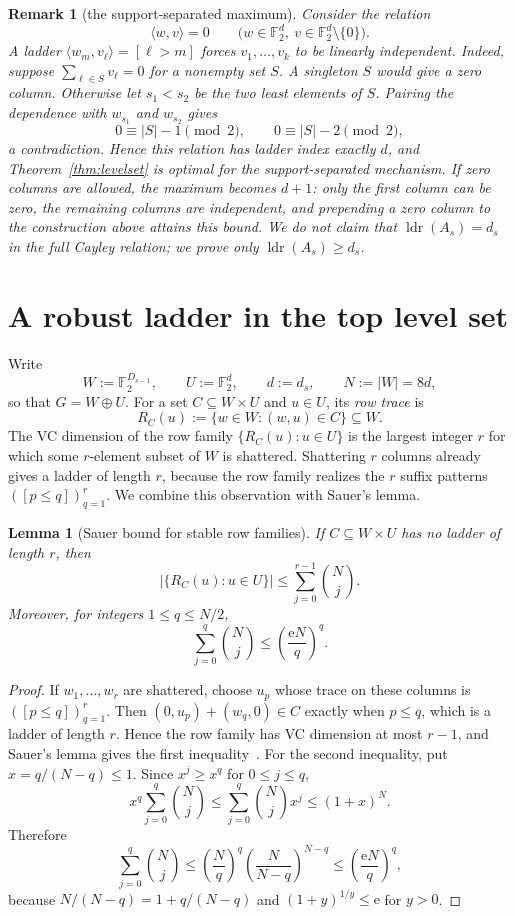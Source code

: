 \documentclass[10pt,a4paper]{amsart}
\newtheorem{lemma}[theorem]{Lemma}
\newtheorem{remark}[theorem]{Remark}
\numberwithin{theorem}{section}
\newcommand{\F}{\mathbb{F}}
\newcommand{\inner}[2]{\langle #1,#2\rangle}
\newcommand{\abs}[1]{\lvert #1\rvert}
\newcommand{\ldr}{\operatorname{ldr}}
\newcommand{\econst}{\mathrm e}
\begin{document}
\begin{remark}[the support-separated maximum]\label{rem:exact}
Consider the relation
\[
  \inner{w}{v}=0
  \qquad\bigl(w\in\F_2^d,\ v\in\F_2^d\setminus\{0\}\bigr).
\]
A ladder $\inner{w_m}{v_\ell}=[\ell>m]$ forces
$v_1,\dots,v_k$ to be linearly independent.  Indeed, suppose
$\sum_{\ell\in S}v_\ell=0$ for a nonempty set $S$.  A singleton $S$ would
give a zero column.  Otherwise let $s_1<s_2$ be the two least elements of
$S$.  Pairing the dependence with $w_{s_1}$ and $w_{s_2}$ gives
\[
  0\equiv\abs S-1\pmod2,
  \qquad
  0\equiv\abs S-2\pmod2,
\]
a contradiction.  Hence this relation has ladder index exactly $d$, and
Theorem~\ref{thm:levelset} is optimal for the support-separated mechanism.
If zero columns are allowed, the maximum becomes $d+1$: only the first
column can be zero, the remaining columns are independent, and prepending a
zero column to the construction above attains this bound.  We do not
claim that $\ldr(A_s)=d_s$ in the full Cayley relation; we prove only
$\ldr(A_s)\ge d_s$.
\end{remark}

\section{A robust ladder in the top level set}\label{sec:robust}

Write
\[
  W:=\F_2^{D_{s-1}},\qquad U:=\F_2^{d},\qquad d:=d_s,
  \qquad N:=\abs W=8d,
\]
so that $G=W\oplus U$.  For a set $C\subseteq W\times U$ and $u\in U$, its
\emph{row trace} is
\[
  R_C(u):=\{w\in W:(w,u)\in C\}\subseteq W.
\]
The VC dimension of the row family $\{R_C(u):u\in U\}$ is the largest
integer $r$ for which some $r$-element subset of $W$ is shattered.  Shattering
$r$ columns already gives a ladder of length $r$, because the row family
realizes the $r$ suffix patterns $([p\le q])_{q=1}^r$.  We combine this
observation with Sauer's lemma.

\begin{lemma}[Sauer bound for stable row families]\label{lem:trace-bound}
If $C\subseteq W\times U$ has no ladder of length $r$, then
\[
  \abs{\{R_C(u):u\in U\}}
  \le \sum_{j=0}^{r-1}\binom Nj.
\]
Moreover, for integers $1\le q\le N/2$,
\[
  \sum_{j=0}^{q}\binom Nj\le\left(\frac{\econst N}{q}\right)^q.
\]
\end{lemma}

\begin{proof}
If $w_1,\dots,w_r$ are shattered, choose $u_p$ whose trace on these columns
is $([p\le q])_{q=1}^r$.  Then $(0,u_p)+(w_q,0)\in C$ exactly when $p\le q$,
which is a ladder of length $r$.  Hence the row family has VC dimension at
most $r-1$, and Sauer's lemma gives the first inequality~\cite{Sauer}.  For
the second inequality, put $x=q/(N-q)\le1$.  Since $x^j\ge x^q$ for
$0\le j\le q$,
\[
  x^q\sum_{j=0}^{q}\binom Nj
  \le \sum_{j=0}^{q}\binom Nj x^j
  \le (1+x)^N.
\]
Therefore
\[
  \sum_{j=0}^{q}\binom Nj
  \le \left(\frac Nq\right)^q
       \left(\frac N{N-q}\right)^{N-q}
  \le \left(\frac{\econst N}{q}\right)^q,
\]
because $N/(N-q)=1+q/(N-q)$ and $(1+y)^{1/y}\le\econst$ for $y>0$.
\end{proof}
\end{document}

